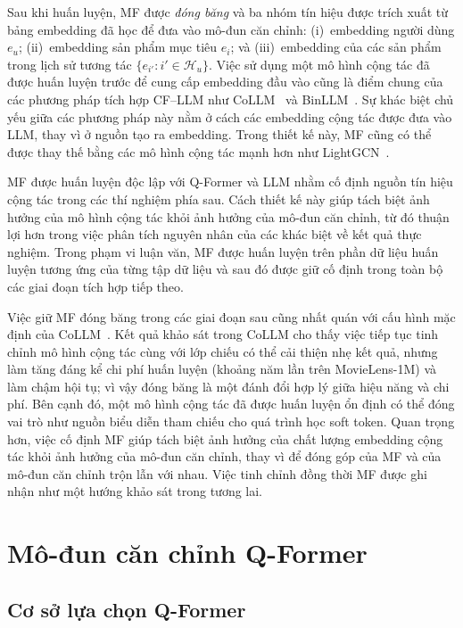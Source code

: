 Sau khi huấn luyện, MF được \textit{đóng băng} và ba nhóm tín hiệu được trích xuất từ bảng
embedding đã học để đưa vào mô-đun căn chỉnh: (i)~embedding người dùng $e_u$; (ii)~embedding
sản phẩm mục tiêu $e_i$; và (iii)~embedding của các sản phẩm trong lịch sử tương tác
$\{e_{i'} : i' \in \mathcal{H}_u\}$. Việc sử dụng một mô hình cộng tác đã được huấn luyện trước để
cung cấp embedding đầu vào cũng là điểm chung của các phương pháp tích hợp CF--LLM như
CoLLM~\cite{collm2023} và BinLLM~\cite{binllm2024}. Sự khác biệt chủ yếu giữa các phương pháp này nằm ở
cách các embedding cộng tác được đưa vào LLM, thay vì ở nguồn tạo ra embedding. Trong thiết kế này,
MF cũng có thể được thay thế bằng các mô hình cộng tác mạnh hơn như LightGCN~\cite{lightgcn2020}.

MF được huấn luyện độc lập với Q-Former và LLM nhằm cố định nguồn tín hiệu cộng tác
trong các thí nghiệm phía sau. Cách thiết kế này giúp tách biệt ảnh hưởng của mô hình
cộng tác khỏi ảnh hưởng của mô-đun căn chỉnh, từ đó thuận lợi hơn trong việc phân tích nguyên nhân
của các khác biệt về kết quả thực nghiệm. Trong phạm vi luận văn, MF được huấn luyện trên phần dữ
liệu huấn luyện tương ứng của từng tập dữ liệu và sau đó được giữ cố định trong toàn bộ các giai đoạn
tích hợp tiếp theo.

Việc giữ MF đóng băng trong các giai đoạn sau cũng nhất quán với cấu hình mặc định của
CoLLM~\cite{collm2023}. Kết quả khảo sát trong CoLLM cho thấy việc tiếp tục tinh chỉnh
mô hình cộng tác cùng với lớp chiếu có thể cải thiện nhẹ kết quả, nhưng làm tăng
đáng kể chi phí huấn luyện (khoảng năm lần trên MovieLens-1M) và làm chậm hội tụ; vì vậy đóng
băng là một đánh đổi hợp lý giữa hiệu năng và chi phí. Bên cạnh đó, một mô hình cộng tác
đã được huấn luyện ổn định có thể đóng vai trò như nguồn biểu diễn tham chiếu cho quá trình học soft
token. Quan trọng hơn, việc cố định MF giúp tách biệt ảnh hưởng của chất lượng embedding cộng tác
khỏi ảnh hưởng của mô-đun căn chỉnh, thay vì để đóng góp của MF và của mô-đun căn chỉnh trộn lẫn
với nhau. Việc tinh chỉnh đồng thời MF được ghi nhận như một hướng khảo sát trong tương lai.

\section{Mô-đun căn chỉnh Q-Former}
\label{sec:qformer}

\subsection{Cơ sở lựa chọn Q-Former}
\label{ssec:ly-do-qformer}


